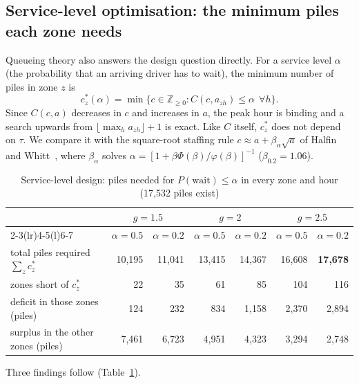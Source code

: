 \documentclass[11pt,a4paper]{article}
\begin{document}
\subsection{Service-level optimisation: the minimum piles each zone needs}
Queueing theory also answers the design question directly. For a service level $\alpha$ (the probability that an arriving driver has to wait), the minimum number of piles in zone $z$ is
\[
c_z^*(\alpha) = \min\{c \in \mathbb Z_{\ge 0} : C(c, a_{zh}) \le \alpha \ \ \forall h\}.
\]
Since $C(c,a)$ decreases in $c$ and increases in $a$, the peak hour is binding and a search upwards from $\lfloor \max_h a_{zh}\rfloor + 1$ is exact. Like $C$ itself, $c_z^*$ does not depend on $\tau$. We compare it with the square-root staffing rule $c \approx a + \beta_\alpha\sqrt{a}$ of Halfin and Whitt~\cite{halfin1981}, where $\beta_\alpha$ solves $\alpha = [1 + \beta\Phi(\beta)/\varphi(\beta)]^{-1}$ ($\beta_{0.2} = 1.06$).
\begin{table}[H]\centering\small
\caption{Service-level design: piles needed for $P(\text{wait}) \le \alpha$ in every zone and hour (17{,}532 piles exist)}\label{tab:m1sl}
\begin{tabular}{@{}lrrrrrr@{}}\toprule
 & \multicolumn{2}{c}{$g = 1.5$} & \multicolumn{2}{c}{$g = 2$} & \multicolumn{2}{c}{$g = 2.5$}\\\cmidrule(lr){2-3}\cmidrule(lr){4-5}\cmidrule(l){6-7}
 & $\alpha=0.5$ & $\alpha=0.2$ & $\alpha=0.5$ & $\alpha=0.2$ & $\alpha=0.5$ & $\alpha=0.2$\\\midrule
total piles required $\sum_z c_z^*$ & 10{,}195 & 11{,}041 & 13{,}415 & 14{,}367 & 16{,}608 & \textbf{17{,}678}\\
zones short of $c_z^*$ & 22 & 35 & 61 & 85 & 104 & 116\\
deficit in those zones (piles) & 124 & 232 & 834 & 1{,}158 & 2{,}370 & 2{,}894\\
surplus in the other zones (piles) & 7{,}461 & 6{,}723 & 4{,}951 & 4{,}323 & 3{,}294 & 2{,}748\\\bottomrule
\end{tabular}
\end{table}
Three findings follow (Table~\ref{tab:m1sl}).
\end{document}
